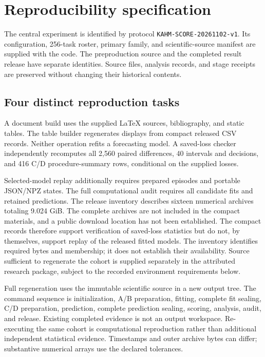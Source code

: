\section{Reproducibility specification}\label{sup:reproduction}
The central experiment is identified by protocol \texttt{KAHM-SCORE-20261102-v1}. Its configuration, 256-task roster, primary family, and scientific-source manifest are supplied with the code. The preproduction source and the completed result release have separate identities. Source files, analysis records, and stage receipts are preserved without changing their historical contents.

\subsection{Four distinct reproduction tasks}
A document build uses the supplied LaTeX sources, bibliography, and static tables. The table builder regenerates displays from compact released CSV records. Neither operation refits a forecasting model. A saved-loss checker independently recomputes all 2,560 paired differences, 40 intervals and decisions, and 416 C/D procedure-summary rows, conditional on the supplied losses.

Selected-model replay additionally requires prepared episodes and portable JSON/NPZ states. The full computational audit requires all candidate fits and retained predictions. The release inventory describes sixteen numerical archives totaling 9.024 GiB. The complete archives are not included in the compact materials, and a public download location has not been established. The compact records therefore support verification of saved-loss statistics but do not, by themselves, support replay of the released fitted models. The inventory identifies required bytes and membership; it does not establish their availability. Source sufficient to regenerate the cohort is supplied separately in the attributed research package, subject to the recorded environment requirements below.

Full regeneration uses the immutable scientific source in a new output tree. The command sequence is initialization, A/B preparation, fitting, complete fit sealing, C/D preparation, prediction, complete prediction sealing, scoring, analysis, audit, and release. Existing completed evidence is not an output workspace. Re-executing the same cohort is computational reproduction rather than additional independent statistical evidence. Timestamps and outer archive bytes can differ; substantive numerical arrays use the declared tolerances.

